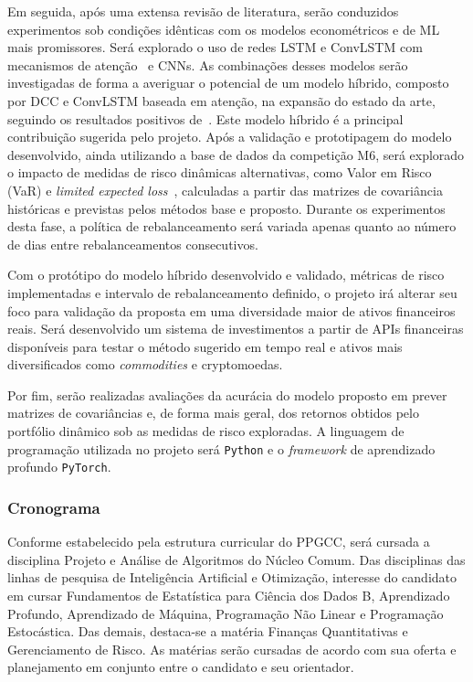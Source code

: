 \documentclass[a4paper, 12pt]{article}
\begin{document}
\begin{spacing}{.9}
Em seguida, após uma extensa revisão de literatura, serão conduzidos
experimentos sob condições idênticas com os modelos econométricos e de ML mais
promissores. Será explorado o uso de redes LSTM e ConvLSTM com mecanismos de
atenção~\cite{attention} e CNNs. As combinações desses modelos serão
investigadas de forma a averiguar o potencial de um modelo híbrido, composto
por DCC e ConvLSTM baseada em atenção, na expansão do estado da arte, seguindo
os resultados positivos de~\cite{dl_multi}. Este modelo híbrido é a principal
contribuição sugerida pelo projeto. Após a validação e prototipagem do modelo
desenvolvido, ainda utilizando a base de dados da competição M6, será explorado
o impacto de medidas de risco dinâmicas alternativas, como Valor em Risco (VaR)
e \emph{limited expected loss}~\cite{gambrah2014risk}, calculadas a partir das
matrizes de covariância históricas e previstas pelos métodos base e proposto.
Durante os experimentos desta fase, a política de rebalanceamento será variada
apenas quanto ao número de dias entre rebalanceamentos consecutivos.

Com o protótipo do modelo híbrido desenvolvido e validado, métricas de risco
implementadas e intervalo de rebalanceamento definido, o projeto irá alterar seu
foco para validação da proposta em uma diversidade maior de ativos financeiros
reais. Será desenvolvido um sistema de investimentos a partir de APIs
financeiras disponíveis para testar o método sugerido em tempo real e ativos
mais diversificados como \emph{commodities} e cryptomoedas.

Por fim, serão realizadas avaliações da acurácia do modelo proposto em prever
matrizes de covariâncias e, de forma mais geral, dos retornos obtidos pelo
portfólio dinâmico sob as medidas de risco exploradas. A linguagem de
programação utilizada no projeto será \verb+Python+ e o \emph{framework} de
aprendizado profundo \verb+PyTorch+.

\subsubsection*{Cronograma}

Conforme estabelecido pela estrutura curricular do PPGCC, será cursada a
disciplina Projeto e Análise de Algoritmos do Núcleo Comum. Das disciplinas das
linhas de pesquisa de Inteligência Artificial e Otimização, interesse do
candidato em cursar Fundamentos de Estatística para Ciência dos Dados B,
Aprendizado Profundo, Aprendizado de Máquina, Programação Não Linear e
Programação Estocástica. Das demais, destaca-se a matéria Finanças Quantitativas
e Gerenciamento de Risco. As matérias serão cursadas de acordo com sua oferta e
planejamento em conjunto entre o candidato e seu orientador.


\end{spacing}
\end{document}
